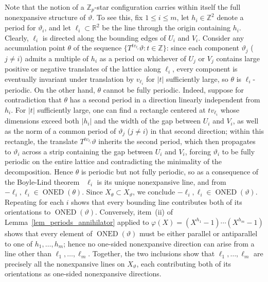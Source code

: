\documentclass[12pt]{amsart}
\numberwithin{equation}{section}
\DeclareMathOperator{\nexpd}{ONED}
\begin{document}
Note that the notion of a $\mathbb{Z}_p$-star configuration carries
within itself the full nonexpansive structure of $\vartheta$.
To see this, fix $1 \leq i \leq m$, let $h_i \in \mathbb{Z}^2$ denote
a period for $\vartheta_i$, and let $\ell_i \subset \mathbb{R}^2$ be
the line through the origin containing $h_i$. Clearly, $\ell_i $ is directed 
along the bounding edges of $U_i$ and $ V_i $. Consider any accumulation
point $\theta$ of the sequence $\{T^{t v_{\pmb{\ell}_i}}\vartheta :
t \in \mathbb{Z}\}$: since each component $\vartheta_j$  ($j \neq i$) admits a
multiple of $h_i$ as a period on whichever of $U_j$ or $V_j$ contains
large positive or negative translates of the lattice along $\ell_i$, every component
is eventually invariant under translation by $v_{\pmb{\ell}_i}$ for
$|t|$ sufficiently large, so $\theta$ is $\ell_i$-periodic. On the other
hand, $\theta$ cannot be fully periodic. Indeed, suppose for contradiction
that $\theta$ has a second period in a direction linearly independent
from $h_i$. For $|t|$ sufficiently large, one can find a rectangle
centered at $t v_{\pmb{\ell}_i}$ whose dimensions exceed both $|h_i|$
and the width of the gap between $U_i$ and $V_i$, as well as the norm of a
common period of $\vartheta_j$ ($j \neq i$) in that second direction;
within this rectangle, the translate $T^{tv_{\pmb{\ell}_i}}\vartheta$
inherits the second period, which then propagates to $\vartheta_i$
across a strip containing the gap between $U_i$ and $V_i$, forcing
$\vartheta_i$ to be fully periodic on the entire lattice and contradicting the
minimality of the decomposition. Hence $\theta$ is periodic but not fully
periodic, so as a consequence of the Boyle-Lind theorem~\cite{BoyleLind97} 
$\ell_i$ is its unique nonexpansive line, and from \cite[Proposition~1.3]{Colle23} 
$-\pmb{\ell}_i, \pmb{\ell}_i \in \nexpd(\theta)$. Since
$X_\theta \subset X_\vartheta$, we conclude
$-\pmb{\ell}_i, \pmb{\ell}_i \in \nexpd(\vartheta)$. Repeating for
each $i$ shows that every bounding line contributes both of its
orientations to $\nexpd(\vartheta)$. Conversely, item~(ii) of Lemma~\ref{lem_periods_annihilator} applied
to $\varphi(X)=(X^{h_1}-1)\cdots(X^{h_m}-1)$ shows that every element
of $\nexpd(\vartheta)$ must be either parallel or antiparallel to one of
$h_1,\ldots,h_m$; hence no one-sided nonexpansive direction can arise
from a line other than $\ell_1,\ldots,\ell_m$. Together, the two
inclusions show that $\ell_1,\ldots,\ell_m$ are precisely all the
nonexpansive lines on $X_\vartheta$, each contributing
both of its orientations as one-sided nonexpansive directions.
\end{document}
